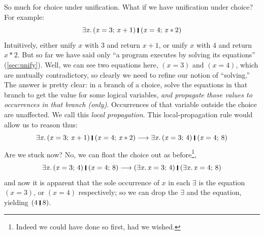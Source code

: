 \documentclass[acmsmall,review,anonymous,dvipsnames]{acmart}
\newcommand{\Varid}[1]{\mathit{#1}}
\begin{document}
So much for choice under unification.  What if we have
unification under choice?  For example:
$$
\ensuremath{\exists\Varid{x}.\,(\Varid{x}\mathrel{=}\mathrm{3};\,\Varid{x}\mathbin{+}\mathrm{1})\;\rule[-0.3mm]{0.5mm}{2.5mm}\;(\Varid{x}\mathrel{=}\mathrm{4};\,\Varid{x}\mathbin{*}\mathrm{2})}
$$
Intuitively, either unify \ensuremath{\Varid{x}} with \ensuremath{\mathrm{3}} and return \ensuremath{\Varid{x}\mathbin{+}\mathrm{1}}, or unify \ensuremath{\Varid{x}} with \ensuremath{\mathrm{4}} and return \ensuremath{\Varid{x}\mathbin{*}\mathrm{2}}.
But so far we have said only ``a program executes by solving its equations'' (\cref{sec:unify}).
Well, we can see two equations here, \ensuremath{(\Varid{x}\mathrel{=}\mathrm{3})} and \ensuremath{(\Varid{x}\mathrel{=}\mathrm{4})}, which are mutually contradictory,
so clearly we need to refine our notion of ``solving.''
The answer is pretty clear: in a branch of a choice, solve the equations in that branch
to get the value for some logical variables, \emph{and propagate those values to occurrences in
  that branch (only)}. Occurrences of that variable outside the choice are unaffected.  We call
this \emph{local propagation}.
This local-propagation rule would allow us to reason thus:
$$
\ensuremath{\exists\Varid{x}.\,(\Varid{x}\mathrel{=}\mathrm{3};\,\Varid{x}\mathbin{+}\mathrm{1})\;\rule[-0.3mm]{0.5mm}{2.5mm}\;(\Varid{x}\mathrel{=}\mathrm{4};\,\Varid{x}\mathbin{*}\mathrm{2})} \movesto  \ensuremath{\exists\Varid{x}.\,(\Varid{x}\mathrel{=}\mathrm{3};\,\mathrm{4})\;\rule[-0.3mm]{0.5mm}{2.5mm}\;(\Varid{x}\mathrel{=}\mathrm{4};\,\mathrm{8})}
$$
Are we stuck now?  No, we can float the choice out as
before\footnote{Indeed we could have done so first, had we wished.},
$$
\ensuremath{\exists\Varid{x}.\,(\Varid{x}\mathrel{=}\mathrm{3};\,\mathrm{4})\;\rule[-0.3mm]{0.5mm}{2.5mm}\;(\Varid{x}\mathrel{=}\mathrm{4};\,\mathrm{8})} \movesto \ensuremath{(\exists\Varid{x}.\,\Varid{x}\mathrel{=}\mathrm{3};\,\mathrm{4})\;\rule[-0.3mm]{0.5mm}{2.5mm}\;(\exists\Varid{x}.\,\Varid{x}\mathrel{=}\mathrm{4};\,\mathrm{8})}
$$
and now it is apparent that the sole occurrence of \ensuremath{\Varid{x}} in each \ensuremath{\exists} is the equation
\ensuremath{(\Varid{x}\mathrel{=}\mathrm{3})}, or \ensuremath{(\Varid{x}\mathrel{=}\mathrm{4})} respectively; so we can drop the \ensuremath{\exists} and the equation, yielding \ensuremath{(\mathrm{4}\;\rule[-0.3mm]{0.5mm}{2.5mm}\;\mathrm{8})}.
\end{document}
